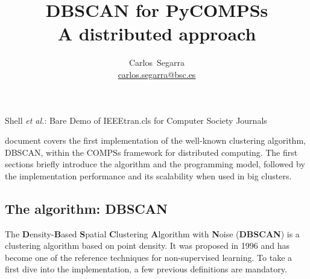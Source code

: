 \documentclass[10pt,journal,compsoc]{IEEEtran}
\begin{document}
%
\title{DBSCAN for PyCOMPSs\\ \LARGE{A distributed approach}}

\author{Carlos~Segarra \\ 
\href{mailto:carlos.segarra@bsc.es}{carlos.segarra@bsc.es}}

%
{Shell \MakeLowercase{\textit{et al.}}: Bare Demo of IEEEtran.cls for Computer Society Journals}

\maketitle
\IEEEdisplaynontitleabstractindextext
\IEEEpeerreviewmaketitle
{}

 document covers the first implementation of the well-known clustering algorithm, DBSCAN, within the COMPSs framework for distributed computing. The first sections briefly introduce the algorithm and the programming model, followed by the implementation performance and its scalability when used in big clusters. 

\subsection{The algorithm: DBSCAN} \label{the_algorithm}
The \textbf{D}ensity-\textbf{B}ased \textbf{S}patial \textbf{C}lustering \textbf{A}lgorithm with \textbf{N}oise (\textbf{DBSCAN}) is a clustering algorithm based on point density. It was proposed in 1996 \cite{ReferencePaper} and has become one of the reference techniques for non-supervised learning. To take a first dive into the implementation, a few previous definitions are mandatory.
\end{document}
